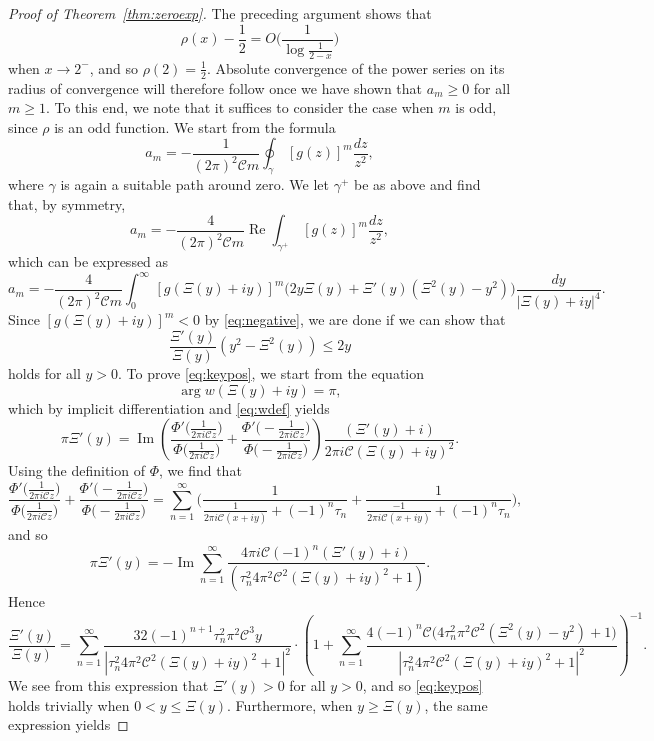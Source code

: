 \documentclass[12pt]{amsart}
\theoremstyle{plain}
\numberwithin{equation}{section}
\theoremstyle{definition}
\newcommand{\im}{\operatorname{Im}}
\newcommand{\Cone}{\mathscr{C}}
\begin{document}
\begin{proof}[Proof of Theorem~\ref{thm:zeroexp}]
The preceding argument shows that
\begin{equation}  \label{eq:oncirc} \rho(x)-\frac12 =O\Big(\frac{1}{\log \frac{1}{2-x}}\Big) \end{equation}
when $x\to 2^{-}$, and so $\rho(2)=\frac12$. Absolute convergence of the power series on its radius of convergence will therefore follow once we have shown that $a_m\ge 0$ for all $m\ge 1$.
To this end, we note that it suffices to consider the case when $m$ is odd, since $\rho$ is an odd function. We start from the formula
\[ a_m=-\frac{1}{(2\pi )^2 \Cone m}\oint_{\gamma}\, [g(z)]^m \frac{dz}{z^2}, \]
where $\gamma$ is again a suitable path around zero. We let $\gamma^+$ be as above and find that, by symmetry,
\[ a_m=-  \frac{4}{(2\pi )^2 \Cone m} \operatorname{Re} \int_{\gamma^+}\,  [g(z)]^m \frac{dz}{z^2},\]
which can be expressed as
 \[ a_m=-  \frac{4}{(2\pi )^2 \Cone m}  \int_{0}^\infty \,  [g(\Xi(y)+iy)]^m \big(2y \Xi(y)+\Xi'(y)(\Xi^2(y)-y^2)\big) \frac{dy}{|\Xi(y)+iy|^4}.\]
 Since $ [g(\Xi(y)+iy)]^m<0$ by \eqref{eq:negative}, we are done if we can show that
 \begin{equation} \label{eq:keypos} \frac{\Xi'(y)}{\Xi(y)} (y^2-\Xi^2(y)) \le 2 y \end{equation}
 holds for all $y>0$. To prove \eqref{eq:keypos}, we start from the equation
 \[ \arg w(\Xi(y)+iy)=\pi , \]
 which by implicit differentiation and \eqref{eq:wdef} yields
 \[ \pi \Xi'(y) =\operatorname{Im} \left( \frac{\Phi'\big(\frac{1}{2\pi i \Cone z}\big)}{\Phi\big(\frac{1}{2\pi i \Cone z}\big)}
 + \frac{\Phi'\big(-\frac{1}{2\pi i \Cone z}\big)}{\Phi\big(-\frac{1}{2\pi i \Cone z}\big)}\right) \frac{(\Xi'(y)+i)}{2\pi i \Cone(\Xi(y)+iy)^2} .\]
Using the definition of $\Phi$, we find that
 \[ \frac{\Phi'\big(\frac{1}{2\pi i \Cone z}\big)}{\Phi\big(\frac{1}{2\pi i \Cone z}\big)}
 + \frac{\Phi'\big(-\frac{1}{2\pi i \Cone z}\big)}{\Phi\big(-\frac{1}{2\pi i \Cone z}\big)}
 = \sum_{n=1}^{\infty} \Big(\frac{1}{\frac{1}{ 2\pi i \Cone(x+iy)}+(-1)^n\tau_n} + \frac{1}{\frac{-1}{ 2\pi i \Cone(x+iy)}+(-1)^n\tau_n}\Big), \]
 and so
 \[ \pi \Xi'(y)=- \im  \sum_{n=1}^{\infty} \frac{4\pi i \Cone (-1)^n (\Xi'(y)+i)}{(\tau_n^2  4\pi^2 \Cone^2(\Xi(y)+iy)^2+1)} .\]
 Hence
 \[ \frac{\Xi'(y)}{\Xi(y)}= \sum_{n=1}^\infty \frac{32 (-1)^{n+1}\tau_n^2 \pi^2 \Cone^3  y}{|\tau_n^2  4\pi^2 \Cone^2(\Xi(y)+iy)^2+1|^2} \cdot \left(1+\sum_{n=1}^\infty \frac{4(-1)^n \Cone\big(4\tau_n^2 \pi^2 \Cone^2(\Xi^2(y)-y^2)+1\big)}{|\tau_n^2  4\pi^2 \Cone^2(\Xi(y)+iy)^2+1|^2} \right)^{-1}.\]
 We see from this expression that $\Xi'(y)> 0$ for all $y>0 $, and so \eqref{eq:keypos} holds trivially when $0<y\le \Xi(y)$. Furthermore, when $y\ge \Xi(y)$, the same expression yields

\end{proof}
\end{document}
